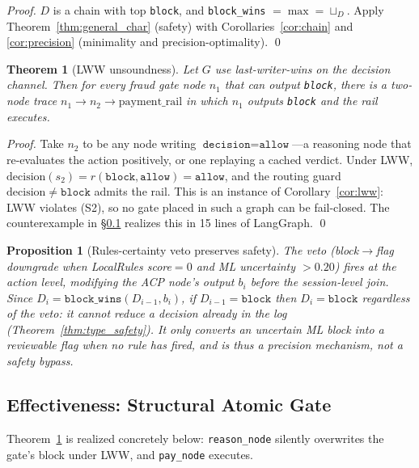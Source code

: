 \documentclass{article}
\newtheorem{proposition}{Proposition}
\newtheorem{theorem}{Theorem}
\begin{document}
\begin{proof}
$D$ is a chain with top \texttt{block}, and \texttt{block\_wins} $=\max=\sqcup_D$. Apply
Theorem~\ref{thm:general_char} (safety) with Corollaries~\ref{cor:chain} and
\ref{cor:precision} (minimality and precision-optimality). \qed
\end{proof}

\begin{theorem}[LWW unsoundness]
\label{thm:lww_unsound}
Let $G$ use last-writer-wins on the decision channel. Then for \emph{every} fraud gate node
$n_1$ that can output \texttt{block}, there is a two-node trace
$n_1\to n_2\to\mathrm{payment\_rail}$ in which $n_1$ outputs \texttt{block} and the rail executes.
\end{theorem}

\begin{proof}
Take $n_2$ to be any node writing $\texttt{decision}=\texttt{allow}$---a reasoning node that
re-evaluates the action positively, or one replaying a cached verdict. Under LWW,
$\mathrm{decision}(s_2)=r(\texttt{block},\texttt{allow})=\texttt{allow}$, and the routing guard
$\mathrm{decision}\ne\texttt{block}$ admits the rail. This is an instance of
Corollary~\ref{cor:lww}: LWW violates (S2), so no gate placed in such a graph can be
fail-closed. The counterexample in \S\ref{sec:gate} realizes this in 15 lines of LangGraph. \qed
\end{proof}

\begin{proposition}[Rules-certainty veto preserves safety]
\label{prop:veto}
The veto (block$\to$flag downgrade when LocalRules score$=0$ and ML uncertainty $>0.20$)
fires at the \emph{action} level, modifying the ACP node's output $b_i$ before the
session-level join. Since $D_i=\texttt{block\_wins}(D_{i-1},b_i)$, if $D_{i-1}=\texttt{block}$
then $D_i=\texttt{block}$ regardless of the veto: it cannot reduce a decision already in the
log (Theorem~\ref{thm:type_safety}). It only converts an \emph{uncertain} ML block into a
reviewable flag when no rule has fired, and is thus a precision mechanism, not a safety bypass.
\end{proposition}

\subsection{Effectiveness: Structural Atomic Gate}
\label{sec:gate}

Theorem~\ref{thm:lww_unsound} is realized concretely below: \texttt{reason\_node} silently
overwrites the gate's block under LWW, and \texttt{pay\_node} executes.
\end{document}
